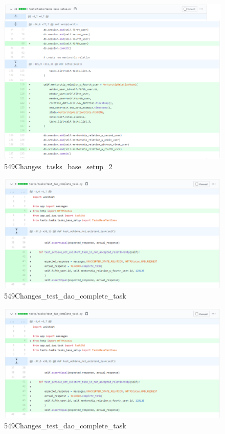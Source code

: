 \documentclass{article}
\begin{document}
\begin{figure}[tph!]
\centerline{\includegraphics[totalheight=15cm, width=16cm]{549Changes_tasks_base_setup_2.png}}
    \caption{549Changes\_tasks\_base\_setup\_2}
    \label{fig:verticalcell}
\end{figure}
\begin{figure}[tph!]
\centerline{\includegraphics[totalheight=13cm, width=17cm]{549Changes_test_dao_complete_task.png}}
    \caption{549Changes\_test\_dao\_complete\_task}
    \label{fig:verticalcell}
\end{figure}
\begin{figure}[tph!]
\centerline{\includegraphics[totalheight=13cm, width=17cm]{549Changes_test_dao_complete_task.png}}
    \caption{549Changes\_test\_dao\_complete\_task}
    \label{fig:verticalcell}
\end{figure}
\end{document}
